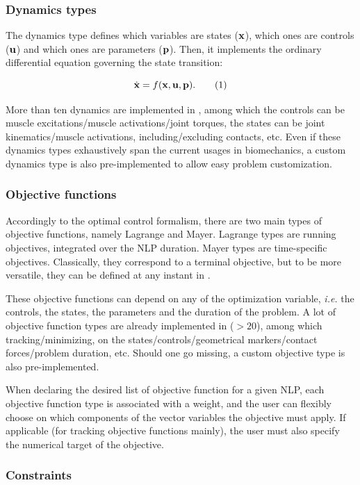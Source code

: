 \subsubsection{Dynamics types}
The dynamics type defines which variables are states ($\mathbf{x}$), which ones are controls ($\mathbf{u}$) and which ones are parameters ($\mathbf{p}$).
Then, it implements the ordinary differential equation governing the state transition:

\[
\dstate = f(\state, \control, \param).
\addtag
\label{eq:state_transition}
\]

\noindent More than ten dynamics are implemented in \bioptim , among which the controls can be muscle excitations/muscle activations/joint torques, the states can be joint kinematics/muscle activations, including/excluding contacts, etc.
Even if these dynamics types exhaustively span the current usages in biomechanics, a custom dynamics type is also pre-implemented to allow easy problem customization.

\subsubsection{Objective functions}
Accordingly to the optimal control formalism, there are two main types of objective functions, namely Lagrange and Mayer. Lagrange types are running objectives, integrated over the NLP duration. Mayer types are time-specific objectives. Classically, they correspond to a terminal objective, but to be more versatile, they can be defined at any instant in \bioptim.

These objective functions can depend on any of the optimization variable, \textit{i.e.} the controls, the states, the parameters and the duration of the problem. A lot of objective function types are already implemented in \bioptim ($>20$), among which tracking/minimizing, on the states/controls/geometrical markers/contact forces/problem duration, etc. Should one go missing, a custom objective type is also pre-implemented.

When declaring the desired list of objective function for a given NLP, each objective function type is associated with a weight, and the user can flexibly choose on which components of the vector variables the objective must apply. If applicable (for tracking objective functions mainly), the user must also specify the numerical target of the objective.

\subsubsection{Constraints}